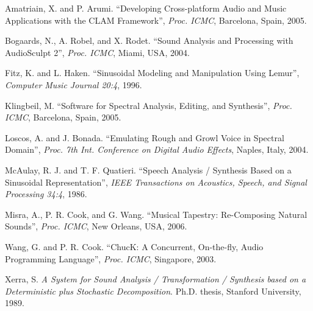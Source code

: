 \documentclass{article}
\begin{document}

\begin{thebibliography}{citations}

 Amatriain, X. and P. Arumi. ``Developing Cross-platform Audio and Music 
Applications with the CLAM Framework'', {\it Proc. ICMC}, Barcelona, Spain, 2005. 

 Bogaards, N., A. Robel, and X. Rodet. ``Sound Analysis and Processing 
with AudioSculpt 2'', {\it Proc. ICMC}, Miami, USA, 2004. 


 Fitz, K. and L. Haken. ``Sinusoidal Modeling and Manipulation Using Lemur'', 
{\it Computer Music Journal 20:4}, 1996. 

 Klingbeil, M. ``Software for Spectral Analysis, Editing, 
and Synthesis'', {\it Proc. ICMC}, 
Barcelona, Spain, 2005. 

 Loscos, A. and J. Bonada. ``Emulating Rough and Growl Voice in Spectral 
Domain'', {\it Proc. 7th Int. Conference on Digital Audio Effects}, Naples, Italy, 2004. 

 McAulay, R. J. and T. F. Quatieri. ``Speech Analysis / Synthesis Based on a 
Sinusoidal Representation'', {\it IEEE Transactions on Acoustics, Speech, and Signal Processing 34:4}, 1986.

 Misra, A., P. R. Cook, and G. Wang. ``Musical
Tapestry: Re-Composing Natural Sounds'', {\it Proc. ICMC}, New Orleans, USA, 2006.


 Wang, G. and P. R. Cook. ``ChucK: A Concurrent, On-the-fly, Audio Programming 
Language'', {\it Proc. ICMC}, Singapore, 2003.

 Xerra, S. {\it A System for Sound Analysis / Transformation / Synthesis based on a 
Deterministic plus Stochastic Decomposition}. Ph.D. thesis, Stanford University, 1989. 


\end{thebibliography}
\end{document}
